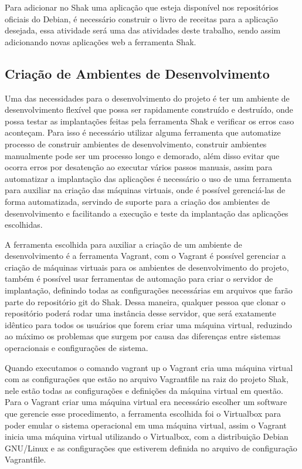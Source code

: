 Para adicionar no Shak uma aplicação que esteja disponível nos repositórios oficiais 
do Debian, é necessário construir o livro de receitas para a
aplicação desejada, essa atividade será uma das atividades deste trabalho, sendo assim
adicionando novas aplicações web a ferramenta Shak.

\subsection{Criação de Ambientes de Desenvolvimento}

Uma das necessidades para o desenvolvimento do projeto é ter um ambiente de desenvolvimento
flexível que possa ser rapidamente construído e destruído, onde possa testar as
implantações feitas pela ferramenta Shak e verificar os erros caso aconteçam. Para isso é necessário utilizar
alguma ferramenta que automatize processo de construir ambientes de desenvolvimento, 
construir ambientes manualmente pode
ser um processo longo e demorado, além disso evitar que ocorra erros por
desatenção ao executar vários passos manuais, assim para automatizar a implantação
das aplicações é necessário o uso de uma ferramenta para auxiliar na criação das
máquinas virtuais, onde é possível gerenciá-las de forma automatizada, servindo de
suporte para a criação dos ambientes de desenvolvimento e facilitando a execução e teste da implantação das
aplicações escolhidas.

A ferramenta escolhida para auxiliar a criação de um ambiente de desenvolvimento é
a ferramenta Vagrant, com o Vagrant é possível gerenciar a criação de máquinas
virtuais para os ambientes de desenvolvimento do projeto, também é possível usar
ferramentas de automação para criar o servidor de implantação, definindo todas
as configurações necessárias
em arquivos que farão parte do repositório git do Shak. Dessa maneira,
qualquer pessoa que clonar o repositório poderá rodar uma instância desse servidor, que será exatamente
idêntico para todos os usuários que forem criar uma máquina virtual, reduzindo ao
máximo os problemas que surgem por causa das diferenças entre sistemas operacionais e configurações de sistema.

Quando executamos o comando vagrant up o Vagrant cria uma máquina virtual com as
configurações que estão no arquivo Vagrantfile na raiz do projeto Shak, nele
estão todas as configurações e definições da máquina virtual em questão. Para o
Vagrant criar uma máquina virtual era necessário escolher um software que gerencie
esse procedimento, a ferramenta escolhida foi o Virtualbox para poder emular o sistema
operacional em uma máquina virtual, assim o Vagrant inicia uma máquina virtual
utilizando o Virtualbox, com a distribuição Debian GNU/Linux e as configurações que estiverem
definida no arquivo de configuração Vagrantfile.

